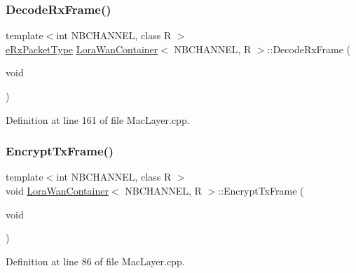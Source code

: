 \mbox{\label{class_lora_wan_container_a757fc71b5986280b6702febbf7bd87f3}} 
\subsubsection{\texorpdfstring{Decode\+Rx\+Frame()}{DecodeRxFrame()}}
{\footnotesize\ttfamily template$<$int N\+B\+C\+H\+A\+N\+N\+EL, class R $>$ \\
\mbox{\hyperlink{_define_8h_ac1b1454c99671113bca600652e09e8bd}{e\+Rx\+Packet\+Type}} \mbox{\hyperlink{class_lora_wan_container}{Lora\+Wan\+Container}}$<$ N\+B\+C\+H\+A\+N\+N\+EL, R $>$\+::Decode\+Rx\+Frame (\begin{DoxyParamCaption}\item[{void}]{ }\end{DoxyParamCaption})}



Definition at line 161 of file Mac\+Layer.\+cpp.

\mbox{\label{class_lora_wan_container_ae9bc11031f33b9bc4928b021a6a34cbd}} 
\subsubsection{\texorpdfstring{Encrypt\+Tx\+Frame()}{EncryptTxFrame()}}
{\footnotesize\ttfamily template$<$int N\+B\+C\+H\+A\+N\+N\+EL, class R $>$ \\
void \mbox{\hyperlink{class_lora_wan_container}{Lora\+Wan\+Container}}$<$ N\+B\+C\+H\+A\+N\+N\+EL, R $>$\+::Encrypt\+Tx\+Frame (\begin{DoxyParamCaption}\item[{void}]{ }\end{DoxyParamCaption})}



Definition at line 86 of file Mac\+Layer.\+cpp.

\mbox{\label{class_lora_wan_container_af7ea3417212b3e06475635e3d392baf2}} 

